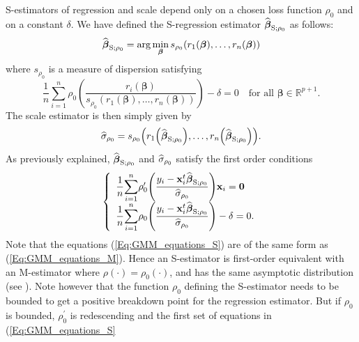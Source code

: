 S-estimators of regression and scale depend only on a chosen loss function
$\rho_{0}$ and on a constant $\delta$. We have defined the S-regression
estimator $\widehat{\boldsymbol\beta}_{\mathrm{S};\rho_{0}}$ as follows:
\begin{equation}
\sthat{\boldsymbol\beta}_{\mathrm{S};\rho_{0}}=\arg\min_{\boldsymbol{\beta
}}s_{\rho_{0}}\left(  r_{1}\left(  \boldsymbol\beta\right)  ,\ldots
,r_{n}\left(  \boldsymbol\beta\right)  \right)  \label{eq:S_min_rho0}%
\end{equation}
where $s_{\rho_{0}}$ is a measure of dispersion satisfying
\[
\frac{1}{n}\sum_{i=1}^{n}\rho_{0}\left(  \frac{r_{i}\left(  \boldsymbol{\beta
}\right)  }{s_{\rho_{0}}\left(  r_{1}\left(  \boldsymbol\beta\right)
,\ldots,r_{n}\left(  \boldsymbol\beta\right)  \right)  }\right)
-\delta=0\quad\text{for all }\boldsymbol\beta\in\mathbb{R}^{p+1}.
\]
The scale estimator is then simply given by
\[
\sthat{\sigma}_{\rho_{0}}=s_{\rho_{0}}\left(  r_{1}\left(  \widehat
{\boldsymbol\beta}_{\mathrm{S};\rho_{0}}\right)  ,\ldots,r_{n}\left(
\sthat{\boldsymbol\beta}_{\mathrm{S};\rho_{0}}\right)  \right)  .
\]
As previously explained, $\widehat{\boldsymbol\beta}_{\mathrm{S};\rho_{0}}$
and $\widehat{\sigma}_{\rho_{0}}$ satisfy the first order conditions
\begin{equation}
\left\{
\begin{array}
[c]{l}%
\dfrac{1}{n}%
{\displaystyle\sum\limits_{i=1}^{n}}
\rho_{0}^{\prime}\left(  \dfrac{y_{i}-\stvec{x}_{i}^{t}\widehat
{\boldsymbol\beta}_{\mathrm{S};\rho_{0}}}{\sthat{\sigma}_{\rho_{0}}%
}\right)  \stvec{x}_{i}=\mathbf{0}\\
\dfrac{1}{n}%
{\displaystyle\sum\limits_{i=1}^{n}}
\rho_{0}\left(  \dfrac{y_{i}-\stvec{x}_{i}^{t}\sthat{\boldsymbol\beta%
}_{\mathrm{S};\rho_{0}}}{\sthat{\sigma}_{\rho_{0}}}\right)  -\delta=0.
\end{array}
\right.  \label{Eq:GMM_equations_S}%
\end{equation}
Note that the equations (\ref{Eq:GMM_equations_S}) are of the same form as
(\ref{Eq:GMM_equations_M}). Hence an S-estimator is first-order equivalent
with an M-estimator where $\rho\left(  \cdot\right)  =\rho_{0}\left(
\cdot\right)  $, and has the same asymptotic distribution (see
\citealp{rousseeuw:yohai:1984}). Note however that the function $\rho_{0}$
defining the S-estimator needs to be bounded to get a positive breakdown point
for the regression estimator. But if $\rho_{0}$ is bounded, $\rho_{0}^{\prime
}$ is redescending and the first set of equations in (\ref{Eq:GMM_equations_S}%
